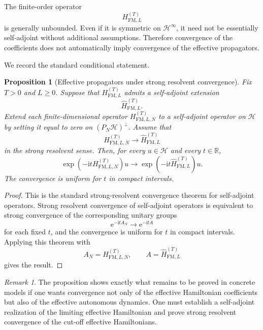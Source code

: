 \documentclass[11pt]{amsart}
\theoremstyle{plain}
\newtheorem{proposition}[theorem]{Proposition}
\theoremstyle{definition}
\theoremstyle{remark}
\newtheorem{remark}[theorem]{Remark}
\newcommand{\Hilb}{\mathcal H}
\newcommand{\ii}{\mathrm i}
\newcommand{\ee}{\mathrm e}
\begin{document}
The finite-order operator
\[
        H_{\mathrm{FM},L}^{(T)}
\]
is generally unbounded.  Even if it is symmetric on
\(\Hilb^\infty\), it need not be essentially self-adjoint without
additional assumptions.  Therefore convergence of the coefficients does
not automatically imply convergence of the effective propagators.

We record the standard conditional statement.

\begin{proposition}[Effective propagators under strong resolvent convergence]
\label{prop:effective-propagator-convergence}
Fix \(T>0\) and \(L\geq0\).  Suppose that
\(H_{\mathrm{FM},L}^{(T)}\) admits a self-adjoint extension
\[
        \widehat H_{\mathrm{FM},L}^{(T)}.
\]
Extend each finite-dimensional operator
\(H_{\mathrm{FM},L,N}^{(T)}\) to a self-adjoint operator on \(\Hilb\) by
setting it equal to zero on \((P_N\Hilb)^\perp\).  Assume that
\[
        H_{\mathrm{FM},L,N}^{(T)}
        \longrightarrow
        \widehat H_{\mathrm{FM},L}^{(T)}
\]
in the strong resolvent sense.  Then, for every \(u\in\Hilb\) and every
\(t\in\mathbb R\),
\[
        \exp\left(-\ii tH_{\mathrm{FM},L,N}^{(T)}\right)u
        \longrightarrow
        \exp\left(-\ii t\widehat H_{\mathrm{FM},L}^{(T)}\right)u.
\]
The convergence is uniform for \(t\) in compact intervals.
\end{proposition}

\begin{proof}
This is the standard strong-resolvent convergence theorem for
self-adjoint operators.  Strong resolvent convergence of self-adjoint
operators is equivalent to strong convergence of the corresponding
unitary groups
\[
        \ee^{-\ii tA_N}
        \longrightarrow
        \ee^{-\ii tA}
\]
for each fixed \(t\), and the convergence is uniform for \(t\) in
compact intervals.  Applying this theorem with
\[
        A_N=H_{\mathrm{FM},L,N}^{(T)},
        \qquad
        A=\widehat H_{\mathrm{FM},L}^{(T)}
\]
gives the result.
\end{proof}

\begin{remark}
The proposition shows exactly what remains to be proved in concrete
models if one wants convergence not only of the effective Hamiltonian
coefficients but also of the effective autonomous dynamics.  One must
establish a self-adjoint realization of the limiting effective
Hamiltonian and prove strong resolvent convergence of the cut-off
effective Hamiltonians.
\end{remark}
\end{document}
